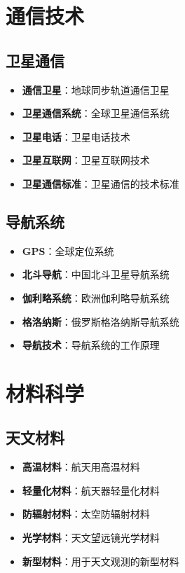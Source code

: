 \documentclass[12pt,UTF8]{ctexbook}
\begin{document}
\chapter{通信技术}
\section{卫星通信}

\begin{itemize}
  \item \textbf{通信卫星}：地球同步轨道通信卫星
  \item \textbf{卫星通信系统}：全球卫星通信系统
  \item \textbf{卫星电话}：卫星电话技术
  \item \textbf{卫星互联网}：卫星互联网技术
  \item \textbf{卫星通信标准}：卫星通信的技术标准
\end{itemize}

\section{导航系统}

\begin{itemize}
  \item \textbf{GPS}：全球定位系统
  \item \textbf{北斗导航}：中国北斗卫星导航系统
  \item \textbf{伽利略系统}：欧洲伽利略导航系统
  \item \textbf{格洛纳斯}：俄罗斯格洛纳斯导航系统
  \item \textbf{导航技术}：导航系统的工作原理
\end{itemize}

\chapter{材料科学}
\section{天文材料}

\begin{itemize}
  \item \textbf{高温材料}：航天用高温材料
  \item \textbf{轻量化材料}：航天器轻量化材料
  \item \textbf{防辐射材料}：太空防辐射材料
  \item \textbf{光学材料}：天文望远镜光学材料
  \item \textbf{新型材料}：用于天文观测的新型材料
\end{itemize}
\end{document}
